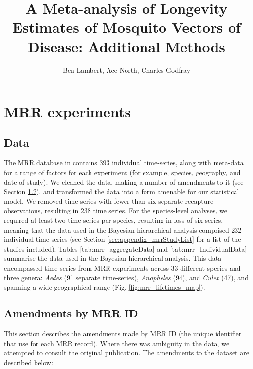 \documentclass[12pt]{article}
\title{A Meta-analysis of Longevity Estimates of Mosquito Vectors of Disease: Additional Methods}
\author{Ben Lambert, Ace North, Charles Godfray}
\begin{document}
\maketitle

\section{MRR experiments}
\subsection{Data}
The MRR database in \cite{guerra2014global} contains 393 individual time-series, along with meta-data for a range of factors for each experiment (for example, species, geography, and date of study). We  cleaned the data, making a number of amendments to it (see Section \ref{sec:amendments}), and transformed the data into a form amenable for our statistical model. We removed time-series with fewer than six separate recapture observations, resulting in 238 time series. For the species-level analyses, we required at least two time series per species, resulting in loss of six series, meaning that the data used in the Bayesian hierarchical analysis comprised 232 individual time series (see Section \ref{sec:appendix_mrrStudyList} for a list of the studies included). Tables \ref{tab:mrr_aggregateData} and \ref{tab:mrr_IndividualData} summarise the data used in the Bayesian hierarchical analysis. This data encompassed time-series from MRR experiments across 33 different species and three genera: \textit{Aedes} (91 separate time-series), \textit{Anopheles} (94), and \textit{Culex} (47), and spanning a wide geographical range (Fig. \ref{fig:mrr_lifetimes_map}).

\subsection{Amendments by MRR ID}\label{sec:amendments}
This section describes the amendments made by MRR ID (the unique identifier that \cite{guerra2014global} use for each MRR record). Where there was ambiguity in the data, we attempted to consult the original publication. The amendments to the dataset are described below:
\end{document}
